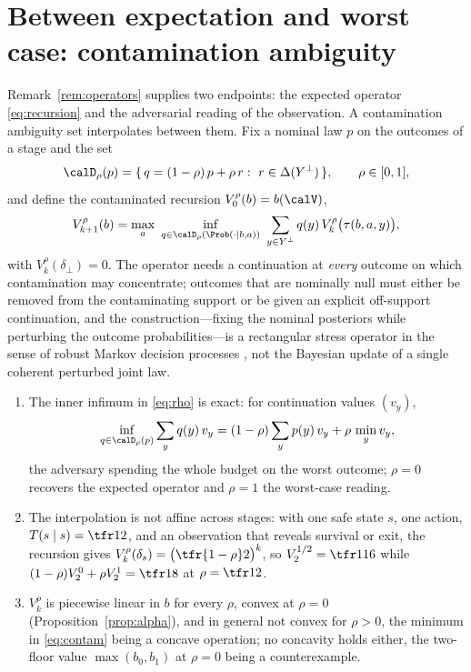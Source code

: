 \section{Between expectation and worst case: contamination ambiguity}\label{sec:dr}

Remark~\ref{rem:operators} supplies two endpoints: the expected operator \eqref{eq:recursion} and the adversarial reading of the observation. A contamination ambiguity set \cite{Huber1964} interpolates between them. Fix a nominal law $p$ on the outcomes of a stage and the set
\[
\calD_\rho(p)=\{\,q=(1-\rho)\,p+\rho\,r:\ r\in\Delta(Y^{\bot})\,\},\qquad \rho\in[0,1],
\]
and define the contaminated recursion $V^{\rho}_0(b)=b(\calV)$,
\begin{equation}\label{eq:rho}
V^{\rho}_{k+1}(b)=\max_{a}\ \inf_{q\in\calD_\rho(\Prob(\cdot\mid b,a))}\ \sum_{y\in Y^{\bot}}q(y)\,V^{\rho}_k\bigl(\tau(b,a,y)\bigr),
\end{equation}
with $V^{\rho}_k(\delta_\bot)=0$. The operator needs a continuation at \emph{every} outcome on which contamination may concentrate; outcomes that are nominally null must either be removed from the contaminating support or be given an explicit off-support continuation, and the construction---fixing the nominal posteriors while perturbing the outcome probabilities---is a rectangular stress operator in the sense of robust Markov decision processes \cite{Iyengar2005,NilimElGhaoui2005}, not the Bayesian update of a single coherent perturbed joint law.

\begin{proposition}\label{prop:dr}
\begin{enumerate}[leftmargin=1.6em,itemsep=1pt]
\item[(i)] The inner infimum in \eqref{eq:rho} is exact: for continuation values $(v_y)$,
\begin{equation}\label{eq:contam}
\inf_{q\in\calD_\rho(p)}\sum_y q(y)\,v_y=(1-\rho)\sum_y p(y)\,v_y+\rho\,\min_y v_y ,
\end{equation}
the adversary spending the whole budget on the worst outcome; $\rho=0$ recovers the expected operator and $\rho=1$ the worst-case reading.
\item[(ii)] The interpolation is not affine across stages: with one safe state $s$, one action, $T(s\mid s)=\tfr12$, and an observation that reveals survival or exit, the recursion gives $V^{\rho}_k(\delta_s)=\bigl(\tfr{1-\rho}2\bigr)^{k}$, so $V^{1/2}_2=\tfr1{16}$ while $(1-\rho)V^{0}_2+\rho V^{1}_2=\tfr18$ at $\rho=\tfr12$.
\item[(iii)] $V^{\rho}_k$ is piecewise linear in $b$ for every $\rho$, convex at $\rho=0$ (Proposition~\ref{prop:alpha}), and in general not convex for $\rho>0$, the minimum in \eqref{eq:contam} being a concave operation; no concavity holds either, the two-floor value $\max(b_0,b_1)$ at $\rho=0$ being a counterexample.
\end{enumerate}
\end{proposition}

